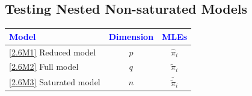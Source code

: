\documentclass[oneside]{book}\usepackage[]{graphicx}\usepackage[svgnames]{xcolor}
\begin{document}
\subsection*{Testing Nested Non-saturated Models}
\begin{table}[!htbp]
      \centering
      \begin{NiceTabular}{lcc}
            \textcolor{Blue}{Model} & \textcolor{Blue}{Dimension} & \textcolor{Blue}{MLEs}\\
            \midrule
            \ref{2.6M1} Reduced model & $ p $ & $ \hat{\pi}_i $\\
            \ref{2.6M2} Full model & $ q $ & $ \tilde{\pi}_i $\\
            \ref{2.6M3} Saturated model & $ n $ & $ \tilde{\tilde{\pi}_i} $\\
            \bottomrule
      \end{NiceTabular}
\end{table}
\end{document}
